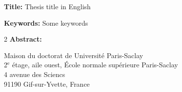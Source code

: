 \documentclass[french,12pt,a4paper]{book}
\begin{document}
\begin{mdframed}[linecolor=Prune,linewidth=1]

\textbf{Title:} Thesis title in English

\noindent \textbf{Keywords:} Some keywords

\begin{multicols}{2}
\noindent \textbf{Abstract:} \lipsum[1-2]
\end{multicols}
\end{mdframed}

\vspace{\fill} %

\noindent
\color{Prune} \footnotesize Maison du doctorat de Université Paris-Saclay\\
2$^{\mathrm{e}}$ étage, aile ouest, École normale supérieure Paris-Saclay\\
4 avenue des Sciencs\\
91190 Gif-sur-Yvette, France
\end{document}
